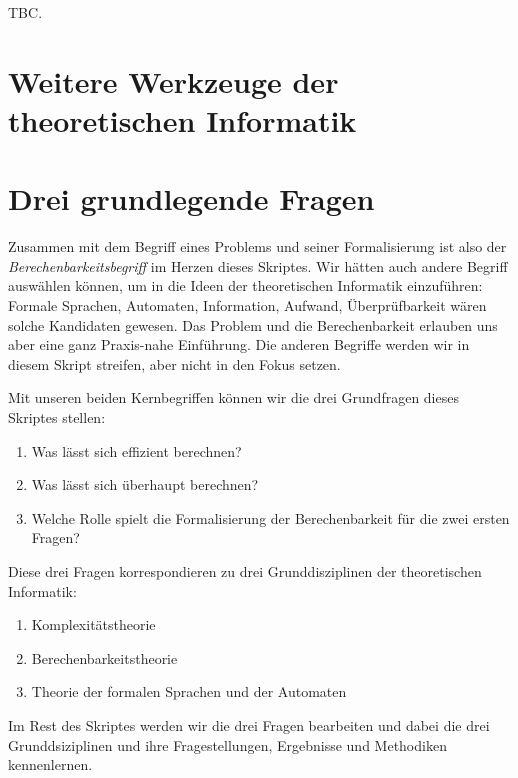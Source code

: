 TBC.

\section{Weitere Werkzeuge der theoretischen Informatik}

\section{Drei grundlegende Fragen}
Zusammen mit dem Begriff eines Problems und seiner Formalisierung ist also der
\emph{Berechenbarkeitsbegriff} im Herzen dieses Skriptes.
Wir hätten auch andere Begriff auswählen können, um in die Ideen der theoretischen Informatik einzuführen:
Formale Sprachen, Automaten, Information, Aufwand, Überprüfbarkeit wären solche Kandidaten gewesen.
Das Problem und die Berechenbarkeit erlauben uns aber eine ganz Praxis-nahe Einführung.
Die anderen Begriffe werden wir in diesem Skript streifen, aber nicht in den Fokus setzen.

Mit unseren beiden Kernbegriffen können wir die drei Grundfragen dieses Skriptes stellen:
\begin{enumerate}
    \item Was lässt sich effizient berechnen?
    \item Was lässt sich überhaupt berechnen?
    \item Welche Rolle spielt die Formalisierung der Berechenbarkeit für die zwei ersten Fragen?
\end{enumerate}

Diese drei Fragen korrespondieren zu drei Grunddisziplinen der theoretischen Informatik:
\begin{enumerate}
    \item Komplexitätstheorie
    \item Berechenbarkeitstheorie
    \item Theorie der formalen Sprachen und der Automaten
\end{enumerate}

Im Rest des Skriptes werden wir die drei Fragen bearbeiten und
dabei die drei Grunddsiziplinen und ihre Fragestellungen, Ergebnisse und Methodiken kennenlernen.
